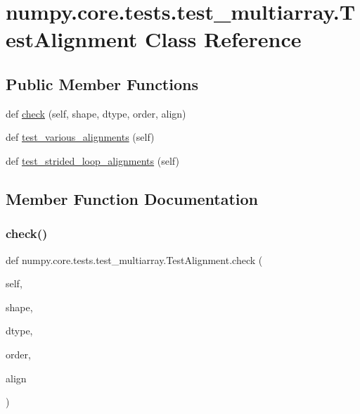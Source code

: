 \hypertarget{classnumpy_1_1core_1_1tests_1_1test__multiarray_1_1TestAlignment}{}\section{numpy.\+core.\+tests.\+test\+\_\+multiarray.\+Test\+Alignment Class Reference}
\label{classnumpy_1_1core_1_1tests_1_1test__multiarray_1_1TestAlignment}
\subsection*{Public Member Functions}
\begin{DoxyCompactItemize}
\item 
def \hyperlink{classnumpy_1_1core_1_1tests_1_1test__multiarray_1_1TestAlignment_a69b1620e256006a697c3552716ce584c}{check} (self, shape, dtype, order, align)
\item 
def \hyperlink{classnumpy_1_1core_1_1tests_1_1test__multiarray_1_1TestAlignment_ab9e01b08c8196d5cdd862cf6e3e5c218}{test\+\_\+various\+\_\+alignments} (self)
\item 
def \hyperlink{classnumpy_1_1core_1_1tests_1_1test__multiarray_1_1TestAlignment_afaf8e02e8ef93ce508c887d48d79abcc}{test\+\_\+strided\+\_\+loop\+\_\+alignments} (self)
\end{DoxyCompactItemize}


\subsection{Member Function Documentation}
\mbox{\label{classnumpy_1_1core_1_1tests_1_1test__multiarray_1_1TestAlignment_a69b1620e256006a697c3552716ce584c}} 
\subsubsection{\texorpdfstring{check()}{check()}}
{\footnotesize\ttfamily def numpy.\+core.\+tests.\+test\+\_\+multiarray.\+Test\+Alignment.\+check (\begin{DoxyParamCaption}\item[{}]{self,  }\item[{}]{shape,  }\item[{}]{dtype,  }\item[{}]{order,  }\item[{}]{align }\end{DoxyParamCaption})}

